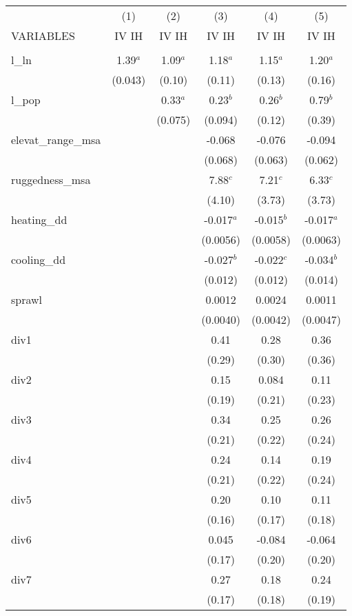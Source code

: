 \documentclass[]{article}
\begin{document}
\begin{tabular}{lccccc} \hline
 & (1) & (2) & (3) & (4) & (5) \\
VARIABLES & IV IH & IV IH & IV IH & IV IH & IV IH \\ \hline
 &  &  &  &  &  \\
l\_ln & 1.39$^a$ & 1.09$^a$ & 1.18$^a$ & 1.15$^a$ & 1.20$^a$ \\
 & (0.043) & (0.10) & (0.11) & (0.13) & (0.16) \\
l\_pop &  & 0.33$^a$ & 0.23$^b$ & 0.26$^b$ & 0.79$^b$ \\
 &  & (0.075) & (0.094) & (0.12) & (0.39) \\
elevat\_range\_msa &  &  & -0.068 & -0.076 & -0.094 \\
 &  &  & (0.068) & (0.063) & (0.062) \\
ruggedness\_msa &  &  & 7.88$^c$ & 7.21$^c$ & 6.33$^c$ \\
 &  &  & (4.10) & (3.73) & (3.73) \\
heating\_dd &  &  & -0.017$^a$ & -0.015$^b$ & -0.017$^a$ \\
 &  &  & (0.0056) & (0.0058) & (0.0063) \\
cooling\_dd &  &  & -0.027$^b$ & -0.022$^c$ & -0.034$^b$ \\
 &  &  & (0.012) & (0.012) & (0.014) \\
sprawl &  &  & 0.0012 & 0.0024 & 0.0011 \\
 &  &  & (0.0040) & (0.0042) & (0.0047) \\
div1 &  &  & 0.41 & 0.28 & 0.36 \\
 &  &  & (0.29) & (0.30) & (0.36) \\
div2 &  &  & 0.15 & 0.084 & 0.11 \\
 &  &  & (0.19) & (0.21) & (0.23) \\
div3 &  &  & 0.34 & 0.25 & 0.26 \\
 &  &  & (0.21) & (0.22) & (0.24) \\
div4 &  &  & 0.24 & 0.14 & 0.19 \\
 &  &  & (0.21) & (0.22) & (0.24) \\
div5 &  &  & 0.20 & 0.10 & 0.11 \\
 &  &  & (0.16) & (0.17) & (0.18) \\
div6 &  &  & 0.045 & -0.084 & -0.064 \\
 &  &  & (0.17) & (0.20) & (0.20) \\
div7 &  &  & 0.27 & 0.18 & 0.24 \\
 &  &  & (0.17) & (0.18) & (0.19) \\

\end{tabular}
\end{document}
